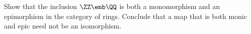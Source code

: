 \documentclass[main.tex]{subfiles}
\begin{document}

\begin{exercise}
	Show that the inclusion \(\ZZ\emb\QQ\) is both a monomorphism and an
	epimorphism in the category \Ring of rings. Conclude that a map that is both
	monic and epic need not be an isomorphism.
\end{exercise}
\end{document}
